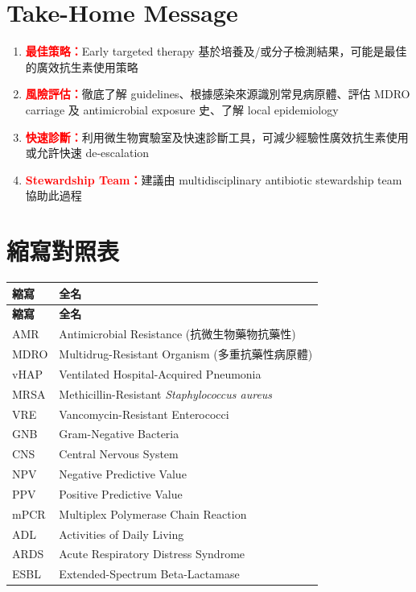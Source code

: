 \documentclass[12pt,a4paper]{article}
\begin{document}
\section{Take-Home Message}

\begin{enumerate}
    \item \textcolor{red}{\textbf{最佳策略：}}Early targeted therapy 基於培養及/或分子檢測結果，可能是最佳的廣效抗生素使用策略
    \item \textcolor{red}{\textbf{風險評估：}}徹底了解 guidelines、根據感染來源識別常見病原體、評估 MDRO carriage 及 antimicrobial exposure 史、了解 local epidemiology
    \item \textcolor{red}{\textbf{快速診斷：}}利用微生物實驗室及快速診斷工具，可減少經驗性廣效抗生素使用或允許快速 de-escalation
    \item \textcolor{red}{\textbf{Stewardship Team：}}建議由 multidisciplinary antibiotic stewardship team 協助此過程
\end{enumerate}

\section{縮寫對照表}

\begin{longtable}{p{3cm}p{11cm}}
\toprule
\textbf{縮寫} & \textbf{全名} \\
\midrule
\endfirsthead

\toprule
\textbf{縮寫} & \textbf{全名} \\
\midrule
\endhead

\bottomrule
\endfoot

AMR & Antimicrobial Resistance (抗微生物藥物抗藥性) \\
MDRO & Multidrug-Resistant Organism (多重抗藥性病原體) \\
vHAP & Ventilated Hospital-Acquired Pneumonia \\
MRSA & Methicillin-Resistant \textit{Staphylococcus aureus} \\
VRE & Vancomycin-Resistant Enterococci \\
GNB & Gram-Negative Bacteria \\
CNS & Central Nervous System \\
NPV & Negative Predictive Value \\
PPV & Positive Predictive Value \\
mPCR & Multiplex Polymerase Chain Reaction \\
ADL & Activities of Daily Living \\
ARDS & Acute Respiratory Distress Syndrome \\
ESBL & Extended-Spectrum Beta-Lactamase \\
\bottomrule
\end{longtable}
\end{document}
